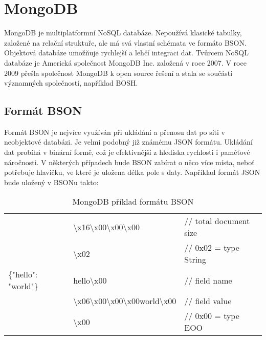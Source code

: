 \section {MongoDB}
\par MongoDB\cite{mongodb} je multiplatformní NoSQL databáze. Nepoužívá klasické tabulky, založené na relační struktuře, ale má svá vlastní schémata ve formáto BSON\cite{mongogbinc}. Objektová databáze umožňuje rychlejší a lehčí integraci dat. Tvůrcem NoSQL databáze je Americká společnost MongoDB\cite{mongodb} Inc. založená v roce 2007. V roce 2009 přešla společnost MongoDB\cite{mongodb} k open source řešení a stala se součástí významných společností, například BOSH.
\subsection {Formát BSON}
\par Formát BSON\cite{mongogbinc} je nejvíce využíván při ukládání a přenosu dat po síti v neobjektové databázi. Je velmi podobný již známému JSON formátu. Ukládání dat probíhá v binární formě, což je efektivnější z hlediska rychlosti i paměťové náročnosti. V některých případech bude BSON zabírat o něco více místa, neboť potřebuje hlavičku, ve které je uložena délka pole s daty.
Například formát JSON bude uložený v BSON\cite{mongogbinc}u takto: 

\begin{table}[h]
\caption[MongoDB příklad formátu BSON]{MongoDB příklad formátu BSON}\label{tab:bson}
\begin{tabulary}{\textwidth} {| l | l | l |}
 						& \textbackslash{x}16\textbackslash{x}00\textbackslash{x}00\textbackslash{x}00 								&// total document size \\
 						& \textbackslash{x}02 																						&// 0x02 = type String\\
\{"hello": "world"\} 	& hello\textbackslash{x}00 																					&// field name\\
 						& \textbackslash{x}06\textbackslash{x}00\textbackslash{x}00\textbackslash{x}00world\textbackslash{x}00 		&// field value\\
 						& \textbackslash{x}00 																						&// 0x00 = type EOO \\
\end{tabulary}
\end{table}
\vfill



                   
  
  
